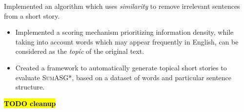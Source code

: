 \begin{contribution}
Implemented an algorithm which uses \textit{similarity} to remove irrelevant sentences from a short story.
\end{contribution}

\begin{itemize}
\item Implemented a scoring mechanism prioritizing information density, while taking into account words which may appear frequently in English, can be considered as the \textit{topic} of the original text.
\item Created a framework to automatically generate topical short stories to evaluate \textsc{SumASG*}, based on a dataset of words and particular sentence structure.
\end{itemize}

\textcolor{red}{\textbf{\hl{TODO cleanup}}}